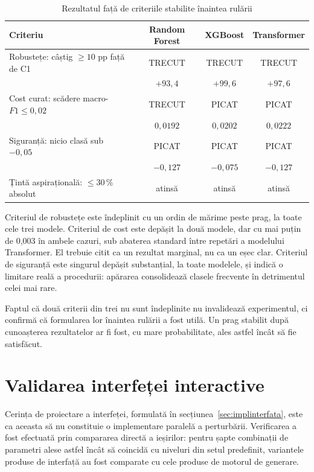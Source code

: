 \begin{table}[H]
    \caption{Rezultatul față de criteriile stabilite înaintea rulării}
    \centering\footnotesize
    \begin{tabular}{|p{3.9cm}|c|c|c|}
        \hline
        \textbf{Criteriu} & \textbf{Random Forest} & \textbf{XGBoost} & \textbf{Transformer} \\
        \hline
        Robustețe: câștig $\geq 10$ pp față de C1
            & TRECUT & TRECUT & TRECUT \\
            & $+93{,}4$ & $+99{,}6$ & $+97{,}6$ \\
        \hline
        Cost curat: scădere macro-$F1 \leq 0{,}02$
            & TRECUT & PICAT & PICAT \\
            & $0{,}0192$ & $0{,}0202$ & $0{,}0222$ \\
        \hline
        Siguranță: nicio clasă sub $-0{,}05$
            & PICAT & PICAT & PICAT \\
            & $-0{,}127$ & $-0{,}075$ & $-0{,}127$ \\
        \hline
        Țintă aspirațională: $\leq 30\,\%$ absolut
            & atinsă & atinsă & atinsă \\
        \hline
    \end{tabular}
    \label{tab:o6-verdict}
\end{table}

Criteriul de robustețe este îndeplinit cu un ordin de mărime peste prag, la toate cele trei modele. Criteriul de cost este depășit la două modele, dar cu mai puțin de 0,003 în ambele cazuri, sub abaterea standard între repetări a modelului Transformer. El trebuie citit ca un rezultat marginal, nu ca un eșec clar. Criteriul de siguranță este singurul depășit substanțial, la toate modelele, și indică o limitare reală a procedurii: apărarea consolidează clasele frecvente în detrimentul celei mai rare.

Faptul că două criterii din trei nu sunt îndeplinite nu invalidează experimentul, ci confirmă că formularea lor înaintea rulării a fost utilă. Un prag stabilit după cunoașterea rezultatelor ar fi fost, cu mare probabilitate, ales astfel încât să fie satisfăcut.


\section{Validarea interfeței interactive}\label{sec:validare-ui}

Cerința de proiectare a interfeței, formulată în secțiunea~\ref{sec:implinterfata}, este ca aceasta să nu constituie o implementare paralelă a perturbării. Verificarea a fost efectuată prin compararea directă a ieșirilor: pentru șapte combinații de parametri alese astfel încât să coincidă cu niveluri din setul predefinit, variantele produse de interfață au fost comparate cu cele produse de motorul de generare.

